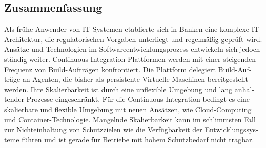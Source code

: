 \begin{otherlanguage}{ngerman}
	\chapter*{Zusammenfassung}
	Als frühe Anwender von IT-Systemen etablierte sich in Banken eine komplexe IT-Architektur, die regulatorischen Vorgaben unterliegt und regelmäßig geprüft wird. Ansätze und Technologien im Softwareentwicklungsprozess entwickeln sich jedoch ständig weiter. Continuous Integration Plattformen werden mit einer steigenden Frequenz von Build-Aufträgen konfrontiert. Die Plattform delegiert Build-Aufträge an Agenten, die bisher als persistente Virtuelle Maschinen bereitgestellt werden. Ihre Skalierbarkeit ist durch eine unflexible Umgebung und lang anhaltender Prozesse eingeschränkt. Für die Continuous Integration bedingt es eine skalierbare und flexible Umgebung mit neuen Ansätzen, wie Cloud-Computing und Container-Technologie. Mangelnde Skalierbarkeit kann im schlimmsten Fall zur Nichteinhaltung von Schutzzielen wie die Verfügbarkeit der Entwicklungssysteme führen und ist gerade für Betriebe mit hohem Schutzbedarf nicht tragbar.
	\end{otherlanguage}
